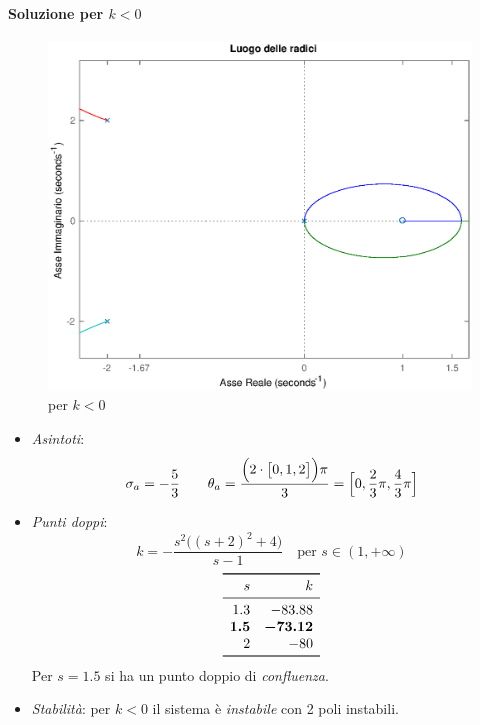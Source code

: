 \paragraph{Soluzione per \(k<0\)}

\begin{figure}[ht]
	\centering
	\includegraphics[scale=.5]{mod1/assets/rl_ex311n}
	\caption{per \(k<0\)}
\end{figure}

\begin{itemize}
	\item \emph{Asintoti}:
		\[
			\sigma_a = -\frac{5}{3} \qquad
			\theta_a = \frac{\Bigl(2\cdot\bigl[0,1,2\bigr]\Bigr)\pi}{3} = \Bigl[0,\frac{2}{3}\pi,\frac{4}{3}\pi\Bigr]
		\]
	\item \emph{Punti doppi}:
		\[
			k = -\frac{s^2\bigl((s+2)^2+4\bigr)}{s-1} \quad
			\text{per } s \in (1,+\infty)
		\]
		\[\begin{array}{rr}
			\toprule
			s 	 & k 		\\
			\midrule
			1.3 	 & -83.88 	\\
			\bm{1.5} & \bm{-73.12} \\
			2 	 & -80 		\\
			\bottomrule
		\end{array}\]
		Per \(s=1.5\) si ha un punto doppio di \emph{confluenza}.
	\item \emph{Stabilità}: per \(k<0\) il sistema è \emph{instabile} con
		2 poli instabili.
\end{itemize}


